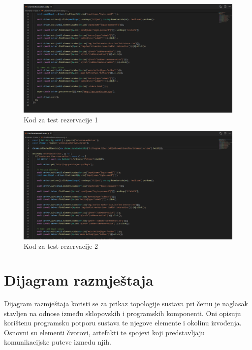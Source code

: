 \begin{figure}[H]
	\includegraphics[width=1\linewidth]{images/OneTimeReservation1.png}
	\caption{Kod za test rezervacije 1}
	\label{fig:OneTimeReservation test - kod1} 
\end{figure}

\begin{figure}[H]
	\includegraphics[width=1\linewidth]{images/OneTimeReservation2.png}
	\caption{Kod za test rezervacije 2}
	\label{fig:OneTimeReservation test - kod2} 
\end{figure}
			
			\eject 
		
		
		\section{Dijagram razmještaja}
			
			
			 Dijagram razmještaja koristi se za prikaz topologije sustava pri čemu je naglasak stavljen na odnose između sklopovskih i programskih komponenti. Oni opisuju korištenu programsku potporu sustava te njegove elemente i okolinu izvođenja. Osnovni su elementi čvorovi, artefakti te spojevi koji predstavljaju komunikacijske puteve između njih.
			 
